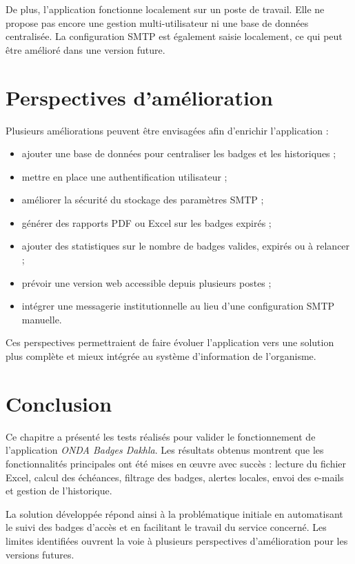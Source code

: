 \documentclass[12pt,a4paper,openany]{report}
\begin{document}
De plus, l'application fonctionne localement sur un poste de travail. Elle ne
propose pas encore une gestion multi-utilisateur ni une base de données
centralisée. La configuration SMTP est également saisie localement, ce qui peut
être amélioré dans une version future.

\section{Perspectives d'amélioration}

Plusieurs améliorations peuvent être envisagées afin d'enrichir l'application :

\begin{itemize}
    \item ajouter une base de données pour centraliser les badges et les historiques ;
    \item mettre en place une authentification utilisateur ;
    \item améliorer la sécurité du stockage des paramètres SMTP ;
    \item générer des rapports PDF ou Excel sur les badges expirés ;
    \item ajouter des statistiques sur le nombre de badges valides, expirés ou à relancer ;
    \item prévoir une version web accessible depuis plusieurs postes ;
    \item intégrer une messagerie institutionnelle au lieu d'une configuration SMTP manuelle.
\end{itemize}

Ces perspectives permettraient de faire évoluer l'application vers une solution
plus complète et mieux intégrée au système d'information de l'organisme.

\section{Conclusion}

Ce chapitre a présenté les tests réalisés pour valider le fonctionnement de
l'application \textit{ONDA Badges Dakhla}. Les résultats obtenus montrent que les
fonctionnalités principales ont été mises en œuvre avec succès : lecture du
fichier Excel, calcul des échéances, filtrage des badges, alertes locales, envoi
des e-mails et gestion de l'historique.

La solution développée répond ainsi à la problématique initiale en automatisant
le suivi des badges d'accès et en facilitant le travail du service concerné. Les
limites identifiées ouvrent la voie à plusieurs perspectives d'amélioration pour
les versions futures.
\end{document}

